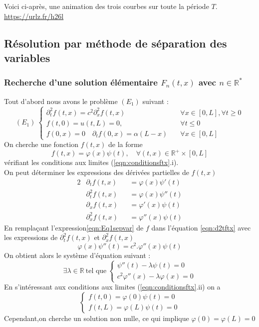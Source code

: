 \documentclass[12pt]{article}
\begin{document}
\noindent Voici ci-après, une animation des trois courbes sur toute la période $T$. \\
\url{https://urlz.fr/h26l}
\subsection{Résolution par méthode de séparation des variables}
\subsubsection{Recherche d'une solution élémentaire $F_n(t,x)$ avec $n \in \mathbb{R}^*$}
Tout d'abord nous avons le problème $(E_1)$ suivant :	
\begin{equation}
\label{eqn:probleme}
(E_{1}) \
\begin{cases}
\partial^{2}_{t} f(t,x)=c^2\partial^{2}_{x} f(t,x) &\forall x \in [0,L], \forall t \geq 0 \\
f(t,0)=u(t,L)=0, &\forall t \leq 0 \\
f(0,x)=0 \quad \partial_t f(0,x)=\alpha (L-x) \quad &\forall x \in [0,L]
\end{cases}
\end{equation}
On cherche une fonction $f(t,x)$ de la forme
\begin{equation}
\label{eqn:Eq1sepvar}
	f(t,x)=\varphi(x) \psi(t), \quad \forall(t,x) \in \mathbb{R}^+ \times [0,L]
\end{equation}
vérifiant les conditions aux limites (\ref{eqn:conditionsftx}.i). \\
On peut déterminer les expressions des dérivées partielles de $f(t,x)$
\begin{alignat*}{2}
	&\partial_{t} f(t,x)		&&=\varphi(x) \psi'(t) \\
	&\partial^{2}_{t} f(t,x)	&&=\varphi(x) \psi''(t) \\
	&\partial_{x} f(t,x)		&&=\varphi'(x) \psi(t) \\
	&\partial^{2}_{x} f(t,x)	&&=\varphi''(x) \psi(t)
\end{alignat*}
En remplaçant l'expression\eqref{eqn:Eq1sepvar} de $f$ dans l'équation \eqref{eqn:d2tftx} avec les expressions de $\partial^{2}_{t} f(t,x)$ et $\partial^{2}_{x} f(t,x)$
\begin{equation*}
	\varphi(x) \psi''(t)=c^2.\varphi''(x) \psi(t)
\end{equation*}
On obtient alors le système d'équation suivant :
\begin{equation*}
	\exists \lambda \in \mathbb{R} \ \text{tel que} \
	\begin{cases}
		\psi ''(t)-\lambda \psi (t) =0 \\
		c^2 \varphi''(x)-\lambda \varphi (x)=0	
	\end{cases}
\end{equation*}
En s'intéressant aux conditions aux limites (\ref{eqn:conditionsftx}.ii) on a
\begin{equation*}
	\begin{cases}
		f(t,0)=\varphi(0) \psi(t)=0 \\
		f(t,L)=\varphi(L) \psi(t)=0	
	\end{cases}
\end{equation*}
Cependant,on cherche un solution non nulle, ce qui implique $\varphi(0)=\varphi(L)=0$
\end{document}
